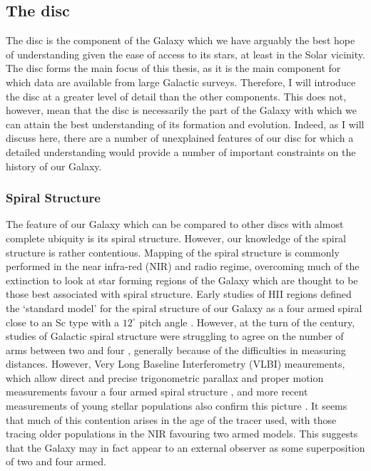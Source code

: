 \subsection{The disc}

The disc is the component of the Galaxy which we have arguably the best hope of understanding given the ease of access to its stars, at least in the Solar vicinity. The disc forms the main focus of this thesis, as it is the main component for which data are available from large Galactic surveys. Therefore, I will introduce the disc at a greater level of detail than the other components. This does not, however, mean that the disc is necessarily the part of the Galaxy with which we can attain the best understanding of its formation and evolution. Indeed, as I will discuss here, there are a number of unexplained features of our disc for which a detailed understanding would provide a number of important constraints on the history of our Galaxy. 

\subsubsection{Spiral Structure}
The feature of our Galaxy which can be compared to other discs with almost complete ubiquity is its spiral structure. However, our knowledge of the spiral structure is rather contentious. Mapping of the spiral structure is commonly performed in the near infra-red (NIR) and radio regime, overcoming much of the extinction to look at star forming regions of the Galaxy which are thought to be those best associated with spiral structure. Early studies of HII regions defined the `standard model' for the spiral structure of our Galaxy as a four armed spiral close to an Sc type with a $12^{\circ}$ pitch angle  \citep{1976A&A....49...57G}. However, at the turn of the century, studies of Galactic spiral structure were struggling to agree on the number of arms between two and four \citep[e.g.][]{1976A&A....46..261S,1980ApJ...239L..53C,1981ApJ...250..551B,1995ApJ...454..119V,2000A&A...358L..13D,2003A&A...397..133R}, generally because of the difficulties in measuring distances. However, Very Long Baseline Interferometry (VLBI) meaurements, which allow direct and precise trigonometric parallax and proper motion measurements favour a four armed spiral structure \citep{2009ApJ...700..137R,2014ApJ...783..130R}, and more recent measurements of young stellar populations also confirm this picture \citep{2014MNRAS.437.1791U,2015MNRAS.450.4150C}. It seems that much of this contention arises in the age of the tracer used, with those tracing older populations in the NIR \citep[e.g.][]{2000A&A...358L..13D} favouring two armed models. This suggests that the Galaxy may in fact appear to an external observer as some superposition of two and four armed. 

